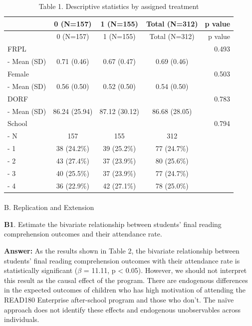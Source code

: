 \documentclass[
  letterpaper,
  DIV=11,
  numbers=noendperiod]{scrartcl}
\makeatletter
\let\oldparagraph\paragraph
\renewcommand{\paragraph}{
    \@ifstar
      \xxxParagraphStar
      \xxxParagraphNoStar
  }
\newcommand{\xxxParagraphStar}[1]{\oldparagraph*{#1}\mbox{}}
\newcommand{\xxxParagraphNoStar}[1]{\oldparagraph{#1}\mbox{}}
\makeatother
\begin{document}
\begin{longtable}[]{@{}lcccr@{}}
\caption{Table 1. Descriptive statistics by assigned
treatment}\tabularnewline
\toprule\noalign{}
& 0 (N=157) & 1 (N=155) & Total (N=312) & p value \\
\midrule\noalign{}
\endfirsthead
\toprule\noalign{}
& 0 (N=157) & 1 (N=155) & Total (N=312) & p value \\
\midrule\noalign{}
\endhead
\bottomrule\noalign{}
\endlastfoot
FRPL & & & & 0.493 \\
- Mean (SD) & 0.71 (0.46) & 0.67 (0.47) & 0.69 (0.46) & \\
Female & & & & 0.503 \\
- Mean (SD) & 0.56 (0.50) & 0.52 (0.50) & 0.54 (0.50) & \\
DORF & & & & 0.783 \\
- Mean (SD) & 86.24 (25.94) & 87.12 (30.12) & 86.68 (28.05) & \\
School & & & & 0.794 \\
- N & 157 & 155 & 312 & \\
- 1 & 38 (24.2\%) & 39 (25.2\%) & 77 (24.7\%) & \\
- 2 & 43 (27.4\%) & 37 (23.9\%) & 80 (25.6\%) & \\
- 3 & 40 (25.5\%) & 37 (23.9\%) & 77 (24.7\%) & \\
- 4 & 36 (22.9\%) & 42 (27.1\%) & 78 (25.0\%) & \\
\end{longtable}

\paragraph{B. Replication and
Extension}\label{b.-replication-and-extension}

\textbf{B1}. Estimate the bivariate relationship between students' final
reading comprehension outcomes and their attendance rate.

\textbf{Answer:} As the results shown in Table 2, the bivariate
relationship between students' final reading comprehension outcomes with
their attendance rate is statistically significant (\(\beta\) = 11.11, p
\textless{} 0.05). However, we should not interpret this result as the
causal effect of the program. There are endogenous differences in the
expected outcomes of children who has high motivation of attending the
READ180 Enterprise after-school program and those who don't. The naïve
approach does not identify these effects and endogenous unobservables
across individuals.
\end{document}
